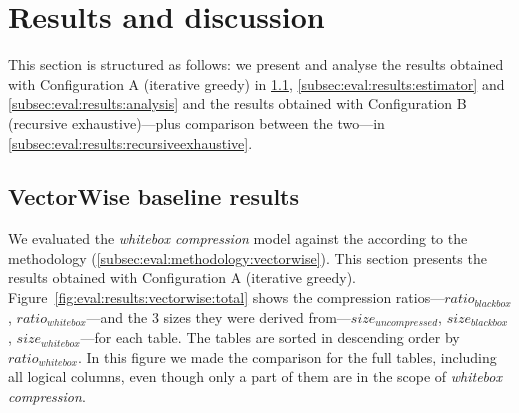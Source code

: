 \section{Results and discussion}
\label{sec:eval:resultsdiscussion}


\graphicspath{{6_evaluation/images/}}

% 

This section is structured as follows: we present and analyse the results obtained with Configuration A (iterative greedy) in \ref{subsec:eval:results:vectorwise}, \ref{subsec:eval:results:estimator} and \ref{subsec:eval:results:analysis} and the results obtained with Configuration B (recursive exhaustive)---plus comparison between the two---in \ref{subsec:eval:results:recursiveexhaustive}.

\subsection{VectorWise baseline results}
\label{subsec:eval:results:vectorwise}

We evaluated the \textit{whitebox compression} model against the  according to the methodology (\ref{subsec:eval:methodology:vectorwise}). This section presents the results obtained with Configuration A (iterative greedy). Figure~\ref{fig:eval:results:vectorwise:total} shows the compression ratios---\(ratio_{blackbox}\), \(ratio_{whitebox}\)---and the 3 sizes they were derived from---\(size_{uncompressed}\), \(size_{blackbox}\), \(size_{whitebox}\)---for each table. The tables are sorted in descending order by \(ratio_{whitebox}\). In this figure we made the comparison for the full tables, including all logical columns, even though only a part of them are in the scope of \textit{whitebox compression}.

